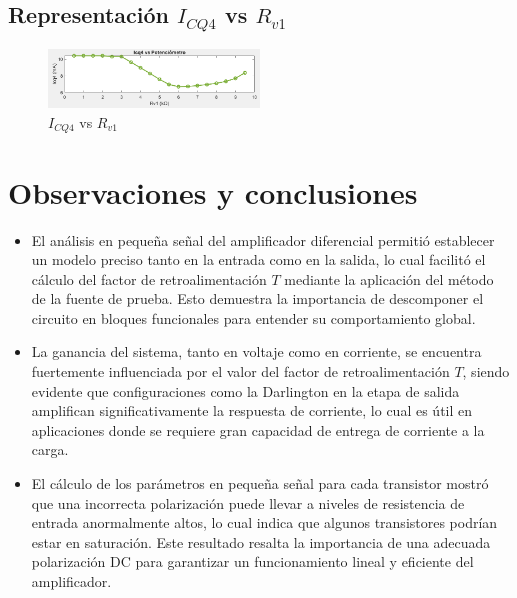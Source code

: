 \documentclass[conference]{IEEEtran}
\begin{document}
    \subsection{ Representación $I_{CQ4}$ vs $R_{v1}$}
    
    \begin{figure}[h]
        \centering
        \includegraphics[width=0.5\textwidth]{media/IMAGENES MATLAB/ICQ4_R.png}
        \caption{$I_{CQ4}$ vs $R_{v1}$}
        \label{fig:Icq4}
    \end{figure}
    
    \section{Observaciones y conclusiones}
    \begin{itemize}
        \item El análisis en pequeña señal del amplificador diferencial permitió establecer un modelo preciso tanto en la entrada como en la salida, lo cual facilitó el cálculo del factor de retroalimentación $T$ mediante la aplicación del método de la fuente de prueba. Esto demuestra la importancia de descomponer el circuito en bloques funcionales para entender su comportamiento global.
    
        \item La ganancia del sistema, tanto en voltaje como en corriente, se encuentra fuertemente influenciada por el valor del factor de retroalimentación $T$, siendo evidente que configuraciones como la Darlington en la etapa de salida amplifican significativamente la respuesta de corriente, lo cual es útil en aplicaciones donde se requiere gran capacidad de entrega de corriente a la carga.
    
        \item El cálculo de los parámetros en pequeña señal para cada transistor mostró que una incorrecta polarización puede llevar a niveles de resistencia de entrada anormalmente altos, lo cual indica que algunos transistores podrían estar en saturación. Este resultado resalta la importancia de una adecuada polarización DC para garantizar un funcionamiento lineal y eficiente del amplificador.
    \end{itemize}

    
	
	
	
	
	
\end{document}

